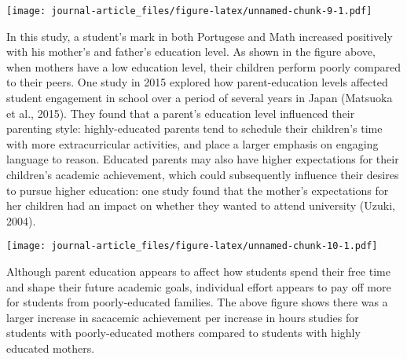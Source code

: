\documentclass[
]{article}
\newenvironment{Shaded}{\begin{snugshade}}{\end{snugshade}}
\newcommand{\DataTypeTok}[1]{\textcolor[rgb]{0.13,0.29,0.53}{#1}}
\newcommand{\DecValTok}[1]{\textcolor[rgb]{0.00,0.00,0.81}{#1}}
\newcommand{\KeywordTok}[1]{\textcolor[rgb]{0.13,0.29,0.53}{\textbf{#1}}}
\newcommand{\NormalTok}[1]{#1}
\newcommand{\OperatorTok}[1]{\textcolor[rgb]{0.81,0.36,0.00}{\textbf{#1}}}
\newcommand{\StringTok}[1]{\textcolor[rgb]{0.31,0.60,0.02}{#1}}
\begin{document}
\texttt{[image: journal-article\_files/figure-latex/unnamed-chunk-9-1.pdf]}

In this study, a student's mark in both Portugese and Math increased
positively with his mother's and father's education level. As shown in
the figure above, when mothers have a low education level, their
children perform poorly compared to their peers. One study in 2015
explored how parent-education levels affected student engagement in
school over a period of several years in Japan (Matsuoka et al., 2015).
They found that a parent's education level influenced their parenting
style: highly-educated parents tend to schedule their children's time
with more extracurricular activities, and place a larger emphasis on
engaging language to reason. Educated parents may also have higher
expectations for their children's academic achievement, which could
subsequently influence their desires to pursue higher education: one
study found that the mother's expectations for her children had an
impact on whether they wanted to attend university (Uzuki, 2004).

\begin{Shaded}
\end{Shaded}

\texttt{[image: journal-article\_files/figure-latex/unnamed-chunk-10-1.pdf]}

Although parent education appears to affect how students spend their
free time and shape their future academic goals, individual effort
appears to pay off more for students from poorly-educated families. The
above figure shows there was a larger increase in sacacemic achievement
per increase in hours studies for students with poorly-educated mothers
compared to students with highly educated mothers.
\end{document}
